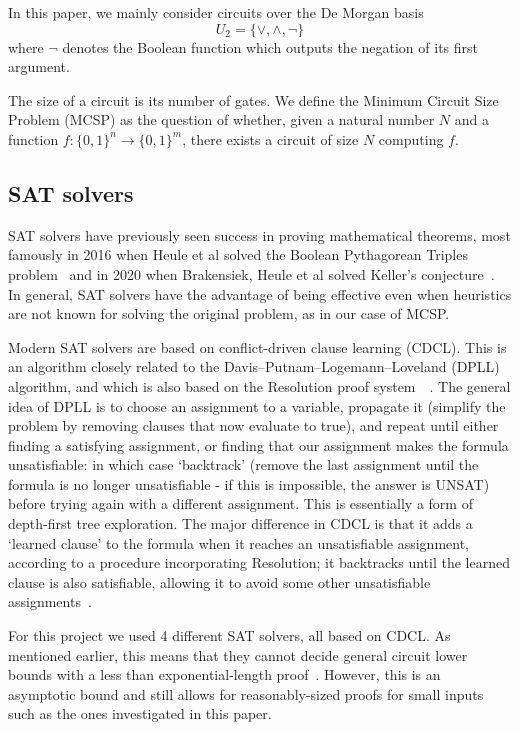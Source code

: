 \documentclass{article}
\begin{document}
In this paper, we mainly consider circuits over the De Morgan basis \[U_2 = \{\lor, \land, \neg\}\] where \(\neg\) denotes the Boolean function which outputs the negation of its first argument.

The size of a circuit is its number of gates. We define the Minimum Circuit Size Problem (MCSP) as the question of whether, given a natural number $N$ and a function \(f: \{0,1\}^n \to \{0,1\}^m\), there exists a circuit of size $N$ computing \(f\).

\subsection{SAT solvers}

SAT solvers have previously seen success in proving mathematical theorems, most famously in 2016 when Heule et al solved the Boolean Pythagorean Triples problem~\cite{heule} and in 2020 when Brakensiek, Heule et al solved Keller's conjecture~\cite{heule2}. In general, SAT solvers have the advantage of being effective even when heuristics are not known for solving the original problem, as in our case of MCSP.

Modern SAT solvers are based on conflict-driven clause learning (CDCL). This is an algorithm closely related to the Davis–Putnam–Logemann–Loveland (DPLL) algorithm, and which is also based on the Resolution proof system~\cite{cdcl}~\cite{krajicek}. The general idea of DPLL is to choose an assignment to a variable, propagate it (simplify the problem by removing clauses that now evaluate to true), and repeat until either finding a satisfying assignment, or finding that our assignment makes the formula unsatisfiable: in which case `backtrack' (remove the last assignment until the formula is no longer unsatisfiable - if this is impossible, the answer is UNSAT) before trying again with a different assignment. This is essentially a form of depth-first tree exploration. The major difference in CDCL is that it adds a `learned clause' to the formula when it reaches an unsatisfiable assignment, according to a procedure incorporating Resolution; it backtracks until the learned clause is also satisfiable, allowing it to avoid some other unsatisfiable assignments~\cite{bayardo97}.

For this project we used 4 different SAT solvers, all based on CDCL. As mentioned earlier, this means that they cannot decide general circuit lower bounds with a less than exponential-length proof~\cite{raz}. However, this is an asymptotic bound and still allows for reasonably-sized proofs for small inputs such as the ones investigated in this paper. 
\end{document}
